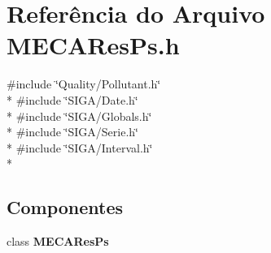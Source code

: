 \section{Referência do Arquivo M\+E\+C\+A\+Res\+Ps.\+h}
\label{_m_e_c_a_res_ps_8h}
{\ttfamily \#include \char`\"{}Quality/\+Pollutant.\+h\char`\"{}}\\*
{\ttfamily \#include \char`\"{}S\+I\+G\+A/\+Date.\+h\char`\"{}}\\*
{\ttfamily \#include \char`\"{}S\+I\+G\+A/\+Globals.\+h\char`\"{}}\\*
{\ttfamily \#include \char`\"{}S\+I\+G\+A/\+Serie.\+h\char`\"{}}\\*
{\ttfamily \#include \char`\"{}S\+I\+G\+A/\+Interval.\+h\char`\"{}}\\*
\subsection*{Componentes}
\begin{DoxyCompactItemize}
\item 
class {\bf M\+E\+C\+A\+Res\+Ps}
\end{DoxyCompactItemize}
